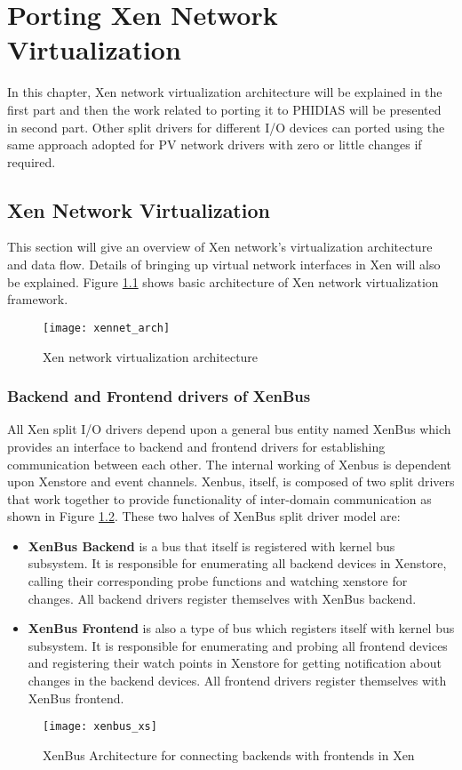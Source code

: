\chapter{Porting Xen Network Virtualization\label{cha:chapter6}}
In this chapter, Xen network virtualization architecture will be explained in the first part and then the work related to porting it to PHIDIAS will be presented in second part. Other split drivers for different I/O devices can ported using the same approach adopted for PV network drivers with zero or little changes if required.

\section{Xen Network Virtualization \label{sec:xennetwork}}
This section will give an overview of Xen network's virtualization architecture and data flow. Details of bringing up virtual network interfaces in Xen will also be explained. Figure \ref{xennet_arch} shows basic architecture of Xen network virtualization framework.
\begin{figure}[!htbp]
	\centering
	\texttt{[image: xennet\_arch]}
	\caption{Xen network virtualization architecture}
	\label{xennet_arch}
\end{figure}

\subsection{Backend and Frontend drivers of XenBus \label{sec:xenbus}}
All Xen split I/O drivers depend upon a general bus entity named XenBus which provides an interface to backend and frontend drivers for establishing communication between each other. The internal working of Xenbus is dependent upon Xenstore and event channels. Xenbus, itself, is composed of two split drivers that work together to provide functionality of inter-domain communication as shown in Figure \ref{xenbus_xs}. These two halves of XenBus split driver model are:
\begin{itemize}
	\item \textbf{XenBus Backend} is a bus that itself is registered with kernel bus subsystem. It is responsible for enumerating all backend devices in Xenstore, calling their corresponding probe functions and watching xenstore for changes. All backend drivers register themselves with XenBus backend.
	\item \textbf{XenBus Frontend} is also a type of bus which registers itself with kernel bus subsystem. It is responsible for enumerating and probing all frontend devices and registering their watch points in Xenstore for getting notification about changes in the backend devices. All frontend drivers register themselves with XenBus frontend.
\end{itemize}
\begin{figure}[!htbp]
	\centering
	\texttt{[image: xenbus\_xs]}
	\caption{XenBus Architecture for connecting backends with frontends in Xen}
	\label{xenbus_xs}
\end{figure}

